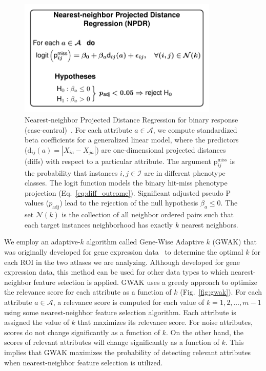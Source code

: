 \documentclass[10pt,letterpaper]{article}\usepackage[]{graphicx}\usepackage[]{color}
\begin{document}
\begin{figure}[h!]
	\centering
	\includegraphics[width=0.85\textwidth]{npdr_finished_diagram.pdf}
	\caption{Nearest-neighbor Projected Distance Regression for binary response (case-control)~\cite{npdr}. For each attribute $a \in \mathcal{A}$, we compute standardized beta coefficients for a generalized linear model, where the predictors ($\text{d}_{ij}(a) = |X_{ia} - X_{ja}|$) are one-dimensional projected distances (diffs) with respect to a particular attribute. The argument $\text{p}^\text{miss}_{ij}$ is the probability that instances $i,j \in \mathcal{I}$ are in different phenotype classes. The logit function models the binary hit-miss phenotype projection (Eq.~\ref{eq:diff_outcome}). Significant adjusted pseudo P values ($p_\text{adj}$) lead to the rejection of the null hypothesis $\beta_a \leq 0$. The set $\mathcal{N}(k)$ is the collection of all neighbor ordered pairs such that each target instances neighborhood has exactly $k$ nearest neighbors.}\label{fig:npdr_finished}
\end{figure}

We employ an adaptive-$k$ algorithm called Gene-Wise Adaptive $k$ (GWAK) that was originally developed for gene expression data~\cite{mckinney13} to determine the optimal $k$ for each ROI in the two atlases we are analyzing. Although developed for gene expression data, this method can be used for other data types to which nearest-neighbor feature selection is applied. GWAK uses a greedy approach to optimize the relevance score for each attribute as a function of $k$ (Fig.~\ref{fig:gwak}). For each attribute $a \in \mathcal{A}$, a relevance score is computed for each value of $k=1,2,\dots,m-1$ using some nearest-neighbor feature selection algorithm. Each attribute is assigned the value of $k$ that maximizes its relevance score. For noise attributes, scores do not change significantly as a function of $k$. On the other hand, the scores of relevant attributes will change significantly as a function of $k$. This implies that GWAK maximizes the probability of detecting relevant attributes when nearest-neighbor feature selection is utilized. 
\end{document}
